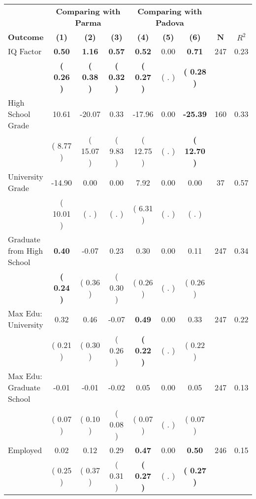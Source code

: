 \begin{tabular}{lcccccccc}
\toprule
 & \multicolumn{3}{c}{\textbf{Comparing with Parma}} & \multicolumn{3}{c}{\textbf{Comparing with Padova}} & \\
\cmidrule(lr){2-4} \cmidrule(lr){5-7} 
 \textbf{Outcome} & \textbf{(1)} & \textbf{(2)} & \textbf{(3)} & \textbf{(4)} & \textbf{(5)} & \textbf{(6)} & \textbf{N} & \textbf{$ R^2$} \\
\midrule
IQ Factor & \textbf{     0.50} & \textbf{     1.16} & \textbf{     0.57} & \textbf{     0.52} &      0.00 & \textbf{     0.71} & 247 &       0.23 \\ 
 & \textbf{(     0.26 )} & \textbf{(     0.38 )} & \textbf{(     0.32 )} & \textbf{(     0.27 )} & (        . ) & \textbf{(     0.28 )} & \\
High School Grade &     10.61 &    -20.07 &      0.33 &    -17.96 &      0.00 & \textbf{   -25.39} & 160 &       0.33 \\ 
 & (     8.77 ) & (    15.07 ) & (     9.83 ) & (    12.75 ) & (        . ) & \textbf{(    12.70 )} & \\
University Grade &    -14.90 &      0.00 &      0.00 &      7.92 &      0.00 &      0.00 & 37 &       0.57 \\ 
 & (    10.01 ) & (        . ) & (        . ) & (     6.31 ) & (        . ) & (        . ) & \\
Graduate from High School & \textbf{     0.40} &     -0.07 &      0.23 &      0.30 &      0.00 &      0.11 & 247 &       0.34 \\ 
 & \textbf{(     0.24 )} & (     0.36 ) & (     0.30 ) & (     0.26 ) & (        . ) & (     0.26 ) & \\
Max Edu: University &      0.32 &      0.46 &     -0.07 & \textbf{     0.49} &      0.00 &      0.33 & 247 &       0.22 \\ 
 & (     0.21 ) & (     0.30 ) & (     0.26 ) & \textbf{(     0.22 )} & (        . ) & (     0.22 ) & \\
Max Edu: Graduate School &     -0.01 &     -0.01 &     -0.02 &      0.05 &      0.00 &      0.05 & 247 &       0.13 \\ 
 & (     0.07 ) & (     0.10 ) & (     0.08 ) & (     0.07 ) & (        . ) & (     0.07 ) & \\
Employed &      0.02 &      0.12 &      0.29 & \textbf{     0.47} &      0.00 & \textbf{     0.50} & 246 &       0.15 \\ 
 & (     0.25 ) & (     0.37 ) & (     0.31 ) & \textbf{(     0.27 )} & (        . ) & \textbf{(     0.27 )} & \\

\end{tabular}
